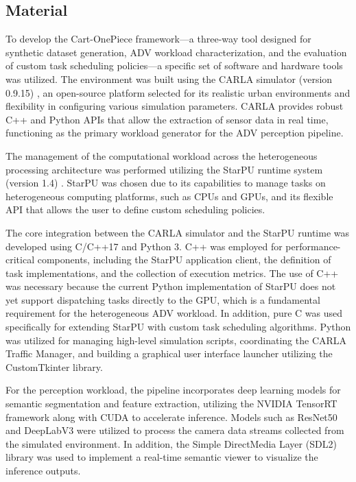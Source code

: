 \subsection{Material}

To develop the Cart-OnePiece framework—a three-way tool designed for synthetic dataset generation, ADV workload characterization, and the evaluation of custom task scheduling policies—a specific set of software and hardware tools was utilized. The environment was built using the CARLA simulator (version 0.9.15) \cite{Dosovitskiy2017}, an open-source platform selected for its realistic urban environments and flexibility in configuring various simulation parameters. CARLA provides robust C++ and Python APIs that allow the extraction of sensor data in real time, functioning as the primary workload generator for the ADV perception pipeline.

The management of the computational workload across the heterogeneous processing architecture was performed utilizing the StarPU runtime system (version 1.4) \cite{Augonnet2011StarPU:Architectures}. StarPU was chosen due to its capabilities to manage tasks on heterogeneous computing platforms, such as CPUs and GPUs, and its flexible API that allows the user to define custom scheduling policies.

The core integration between the CARLA simulator and the StarPU runtime was developed using C/C++17 and Python 3. C++ was employed for performance-critical components, including the StarPU application client, the definition of task implementations, and the collection of execution metrics. The use of C++ was necessary because the current Python implementation of StarPU does not yet support dispatching tasks directly to the GPU, which is a fundamental requirement for the heterogeneous ADV workload. In addition, pure C was used specifically for extending StarPU with custom task scheduling algorithms. Python was utilized for managing high-level simulation scripts, coordinating the CARLA Traffic Manager, and building a graphical user interface launcher utilizing the CustomTkinter library.

For the perception workload, the pipeline incorporates deep learning models for semantic segmentation and feature extraction, utilizing the NVIDIA TensorRT framework \cite{NVIDIATensorRT} along with CUDA to accelerate inference. Models such as ResNet50 and DeepLabV3 were utilized to process the camera data streams collected from the simulated environment. In addition, the Simple DirectMedia Layer (SDL2) library was used to implement a real-time semantic viewer to visualize the inference outputs.

